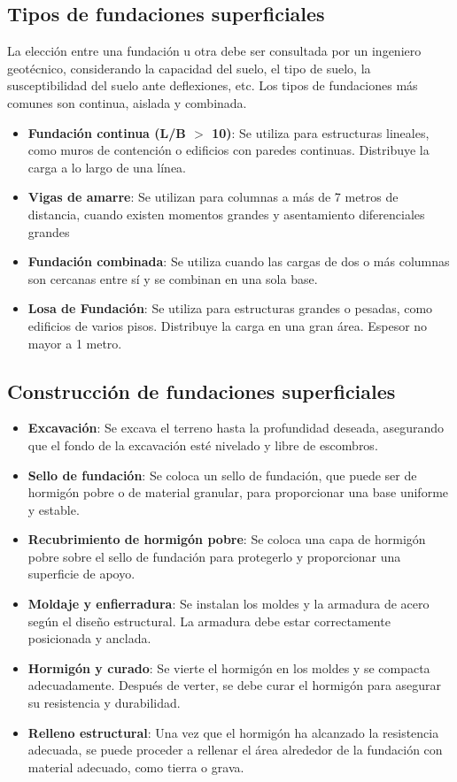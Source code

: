 \documentclass{article} %
\begin{document}
\subsection*{Tipos de fundaciones superficiales}
La elección entre una fundación u otra debe ser consultada por un ingeniero
geotécnico, considerando la capacidad del suelo, el tipo de suelo, la
susceptibilidad del suelo ante deflexiones, etc.
Los tipos de fundaciones más comunes son continua, aislada y combinada.
\begin{itemize}
    \item \textbf{Fundación continua (L/B $>$ 10)}: Se utiliza para estructuras lineales, como muros de contención o edificios con paredes continuas. Distribuye la carga a lo largo de una línea.
    \item \textbf{Vigas de amarre}: Se utilizan para columnas a más de 7 metros de distancia, cuando existen momentos grandes y asentamiento diferenciales grandes
    \item \textbf{Fundación combinada}: Se utiliza cuando las cargas de dos o más columnas son cercanas entre sí y se combinan en una sola base.
    \item \textbf{Losa de Fundación}: Se utiliza para estructuras grandes o pesadas, como edificios de varios pisos. Distribuye la carga en una gran área. Espesor no mayor a 1 metro.
\end{itemize}

\subsection*{Construcción de fundaciones superficiales}
\begin{itemize}
    \item \textbf{Excavación}: Se excava el terreno hasta la profundidad deseada, asegurando que el fondo de la excavación esté nivelado y libre de escombros.
    \item \textbf{Sello de fundación}: Se coloca un sello de fundación, que puede ser de hormigón pobre o de material granular, para proporcionar una base uniforme y estable.
    \item \textbf{Recubrimiento de hormigón pobre}: Se coloca una capa de hormigón pobre sobre el sello de fundación para protegerlo y proporcionar una superficie de apoyo.
    \item \textbf{Moldaje y enfierradura}: Se instalan los moldes y la armadura de acero según el diseño estructural. La armadura debe estar correctamente posicionada y anclada.
    \item \textbf{Hormigón y curado}: Se vierte el hormigón en los moldes y se compacta adecuadamente. Después de verter, se debe curar el hormigón para asegurar su resistencia y durabilidad.
    \item \textbf{Relleno estructural}: Una vez que el hormigón ha alcanzado la resistencia adecuada, se puede proceder a rellenar el área alrededor de la fundación con material adecuado, como tierra o grava.
\end{itemize}
\end{document}
